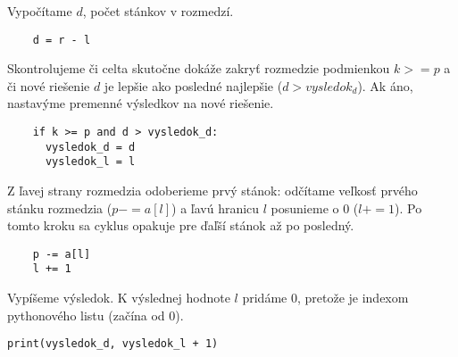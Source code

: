 \documentclass{article}
\begin{document}
Vypočítame $d$, počet stánkov v rozmedzí.

\begin{lstlisting}
    d = r - l
\end{lstlisting}

Skontrolujeme či celta skutočne dokáže zakryť rozmedzie podmienkou $k >= p$ a či nové riešenie $d$ je lepšie ako posledné najlepšie ($d > vysledok_d$). Ak áno, nastavýme premenné výsledkov na nové riešenie.

\begin{lstlisting}
    if k >= p and d > vysledok_d:
      vysledok_d = d
      vysledok_l = l
\end{lstlisting}

Z ľavej strany rozmedzia odoberieme prvý stánok: odčítame veľkosť prvého stánku rozmedzia ($p -= a[l]$) a ľavú hranicu $l$ posunieme o $0$ ($l += 1$). Po tomto kroku sa cyklus opakuje pre ďaľší stánok až po posledný.

\begin{lstlisting}
    p -= a[l]
    l += 1
\end{lstlisting}
    
Vypíšeme výsledok. K výslednej hodnote $l$ pridáme $0$, pretože je indexom pythonového listu (začína od $0$).

\begin{lstlisting}
print(vysledok_d, vysledok_l + 1)
\end{lstlisting}
\end{document}
